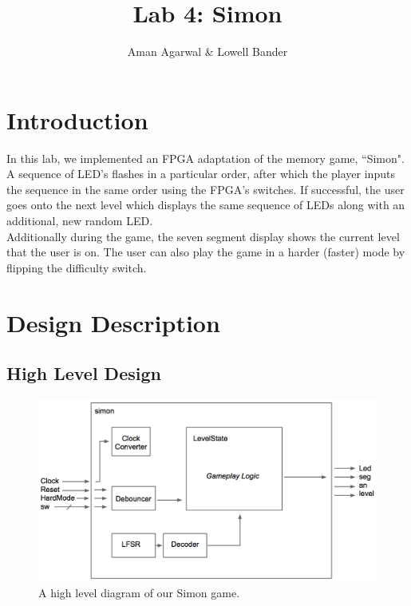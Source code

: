 \documentclass[]{article}
\newcommand{\subtitle}[1]{%
  \posttitle{%
    \par\end{center}
    \begin{center}\large#1\end{center}
    \vskip0.5em}%
}
\begin{document}
\title{Lab 4: Simon}
\subtitle{CS M152A}
\author{Aman Agarwal \& Lowell Bander}

\maketitle
\tableofcontents

\newpage

\section{Introduction}
 
In this lab, we implemented an FPGA adaptation of the memory game, ``Simon". A sequence of LED's flashes in a particular order, after which the player inputs the sequence in the same order using the FPGA's switches. If successful, the user goes onto the next level which displays the same sequence of LEDs along with an additional, new random LED. \\

Additionally during the game, the seven segment display shows the current level that the user is on. The user can also play the game in a harder (faster) mode by flipping the difficulty switch.

\section{Design Description}

\subsection{High Level Design}
\begin{figure}[H]
\centering
\includegraphics[width=\textwidth]{highLevel.png}
\caption{A high level diagram of our Simon game.}
\label{fig:high}
\end{figure}
\end{document}
